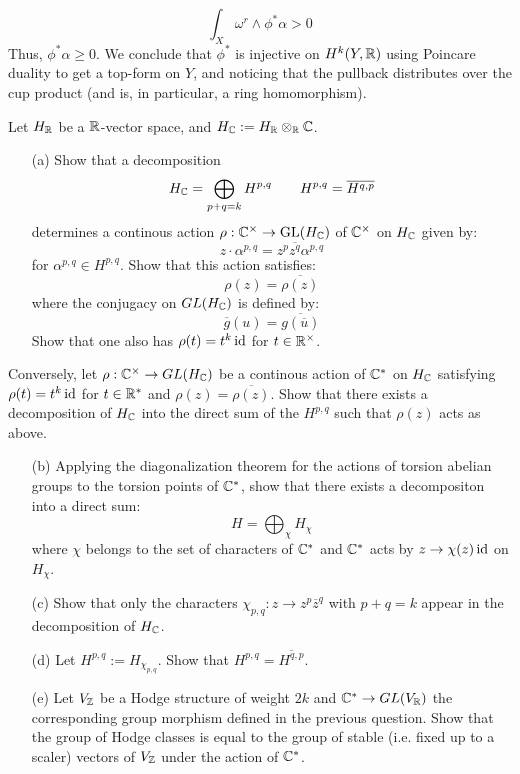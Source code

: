 \documentclass[12pt]{article}
\begin{document}
\begin{solution}
\begin{enumerate}
        \[ \int_X \omega^r \wedge \phi^*\alpha > 0 \]
        Thus, $\phi^* \alpha \geq 0$. We conclude that $\phi^*$ is injective on $H^k(Y, \mathbb R)$ using Poincare duality to get a top-form on $Y$, and noticing that the pullback distributes over the cup product (and is, in particular, a ring homomorphism).      
    \end{enumerate}
\end{solution}


\newpage



\begin{problem}{2}
    Let $H_\mathbb R$ be a $\mathbb R$-vector space, and $H_\mathbb C := H_\mathbb R \otimes_\mathbb R \mathbb C$.
    \begin{enumerate}
        \item[(a)] Show that a decomposition
        \[ H_\mathbb C = \bigoplus_{p+q=k} H^{p,q} \qquad H^{p,q} = \overline{H^{q,p}}\]
        determines a continous action $\rho: \mathbb C^\times \to \text{GL}(H_\mathbb C)$ of $\mathbb C^\times$ on $H_\mathbb C$ given by:
        \[ z \cdot \alpha^{p,q} = z^p\overline{z^q}\alpha^{p,q}\]
        for $\alpha^{p,q} \in H^{p,q}$. Show that this action satisfies: 
        \[ \rho(z) = \overline{\rho(z)}\]  
        where the conjugacy on $GL(H_\mathbb C)$ is defined by: 
        \[ \overline{g}(u) = \overline{g(\overline u)}\]
        Show that one also has $\rho(t) = t^k \operatorname{id}$ for $t \in \mathbb R^\times$.
    \end{enumerate}
        Conversely, let $\rho: \mathbb C^\times \to GL(H_\mathbb C)$ be a continous action of $\mathbb C^*$ on $H_\mathbb C$ satisfying $\rho(t) = t^k \operatorname{id}$ for $t \in \mathbb R^*$ and $\rho(z) = \overline{\rho(z)}$. Show that there exists a decomposition of $H_\mathbb C$ into the direct sum of the $H^{p,q}$ such that $\rho(z)$ acts as above.
    \begin{enumerate}[resume]
        \item[(b)] Applying the diagonalization theorem for the actions of torsion abelian groups to the torsion points of $\mathbb C^*$, show that there exists a decompositon into a direct sum:
        \[ H = \bigoplus_\chi H_\chi\]
        where $\chi$ belongs to the set of characters of $\mathbb C^*$ and $\mathbb C^*$ acts by $z \to \chi(z)\operatorname{id}$ on $H_\chi$.
        \item[(c)] Show that only the characters $\chi_{p, q}: z \to z^p\overline{z}^q$ with $p+q = k$ appear in the decomposition of $H_\mathbb C$.
        \item[(d)] Let $H^{p,q} := H_{\chi_{p,q}}$. Show that $H^{p, q} = \overline{H^{q, p}}$. 
        \item[(e)] Let $V_\mathbb Z$ be a Hodge structure of weight $2k$ and $\mathbb C^* \to GL(V_\mathbb R)$ the corresponding group morphism defined in the previous question. Show that the group of Hodge classes is equal to the group of stable (i.e. fixed up to a scaler) vectors of $V_\mathbb Z$ under the action of $\mathbb C^*$.
    \end{enumerate}
\end{problem}
\end{document}
